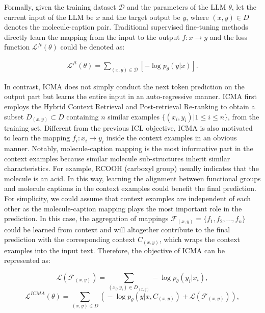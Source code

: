Formally, given the training dataset $\mathcal{D}$ and the parameters of the LLM $\theta$, let the current input of the LLM be $x$ and the target output be $y$, where $(x,y) \in D$ denotes the molecule-caption pair. Traditional supervised fine-tuning methods directly learn the mapping from the input to the output $f: x\rightarrow y$ and the loss function $\mathcal{L}^{ft}(\theta)$ could be denoted as:

{\small
\vskip -0.2in
\begin{align}
    \mathcal{L}^{ft}(\theta) =  \underset{(x,y)\in \mathcal{D}}{\sum}[-\log p_\theta(y|x)].
\end{align}
\vskip -0.1in
}

In contrast, ICMA does not simply conduct the next token prediction on the output part but learns the entire input in an auto-regressive manner. ICMA first employs the Hybrid Context Retrieval and Post-retrieval Re-ranking to obtain a subset $D_{(x,y)} \subset D$ containing $n$ similar examples $\{(x_i, y_i) | 1\leq i \leq n\}$, from the training set. Different from the previous ICL objective, ICMA is also motivated to learn the mapping $f_i: x_i\rightarrow y_i$ inside the context examples in an obvious manner. Notably, molecule-caption mapping is the most informative part in the context examples because similar molecule sub-structures inherit similar characteristics. For example, RCOOH (carboxyl group) usually indicates that the molecule is an acid. In this way, learning the alignment between functional groups and molecule captions in the context examples could benefit the final prediction. For simplicity, we could assume that context examples are independent of each other as the molecule-caption mapping plays the most important role in the prediction.
In this case, the aggregation of mappings $\mathcal{F}_{(x,y)}=\{f_1, f_2, ..., f_{n}\}$ could be learned from context and will altogether contribute to the final prediction with the corresponding context $C_{(x,y)}$, which wraps the context examples into the input text.  
Therefore, the objective of ICMA can be represented as:

\begin{small} 
\begin{equation} 
\mathcal{L}(\mathcal{F}_{(x,y)}) = \underset{(x_i,y_i)\in D_{(x,y)}}{\sum}-\log p_\theta(y_i|x_i) ,
\end{equation} 
\begin{equation}
    \mathcal{L}^{I\!C\!M\!A}(\theta)\!=\!\underset{(x,y)\in D}{\sum}\!\left(\!-\log p_\theta(y|x, C_{(x,y)})\!+\! \mathcal{L}(\mathcal{F}_{(x,y)})\right)\!,
\end{equation}
\end{small}

